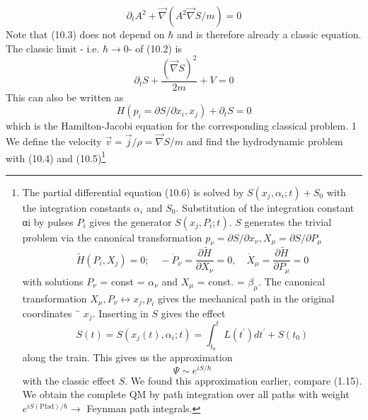 \begin{equation}
    \partial_{t} A^{2}+\vec{\nabla}\left(A^{2} \vec{\nabla} S / m\right)=0
    \end{equation}
Note that (10.3) does not depend on $\hbar$ and is therefore already a classic equation. The classic limit - i.e. $\hbar\rightarrow 0$- of (10.2) is
\begin{equation}
    \partial_{t} S+\frac{(\vec{\nabla} S)^{2}}{2 m}+V=0
    \end{equation}
This can also be written as
\begin{equation}
    H\left(p_{i}=\partial S / \partial x_{i}, x_{j}\right)+\partial_{t} S=0
    \end{equation}
which is the Hamilton-Jacobi equation for the corresponding classical problem. 1
We define the velocity $\vec{v}=\vec{j}/\rho=\vec{\nabla}S/m$  and find the hydrodynamic problem with (10.4) and (10.5)\footnote{The partial differential equation (10.6) is solved by $S (x_j, \alpha_i; t) + S_0$ with the integration constants $\alpha_i$ and $S_0$. Substitution of the integration constant αi by pulses $P_i$ gives the generator $S (x_j, P_i; t)$. $S$ generates the trivial problem via the canonical transformation $p_{\nu}=\partial S/\partial x_{\nu},X_{\mu}=\partial S/\partial P_{\mu}$
\begin{equation}
    \widetilde{H}\left(P_{i}, X_{j}\right)=0 ; \quad-\dot{P}_{\nu}=\frac{\partial \widetilde{H}}{\partial X_{\nu}}=0, \quad \dot{X}_{\mu}=\frac{\partial \widetilde{H}}{\partial P_{\mu}}=0
    \end{equation}
with solutions $P_{\nu}$ = const = $\alpha_{\nu}$ and $X_{\mu}$ = const. = $\beta_{\mu}$. The canonical transformation $X_{\mu},P_{\nu}\leftrightarrow x_j,p_i$ gives the mechanical path in the original coordinates ¨ $x_j$. Inserting in $S$ gives the effect
\begin{equation}
    S(t)=S\left(x_{j}(t), \alpha_{i} ; t\right)=\int_{t_{0}}^{t} L\left(t^{\prime}\right) d t^{\prime}+S\left(t_{0}\right)
    \end{equation}
    along the train. This gives us the approximation
    \begin{equation}
        \Psi \sim e^{iS/\hbar}
    \end{equation}
    with the classic effect $S$. We found this approximation earlier, compare (1.15). We obtain the complete QM by path integration over all paths with weight $e^{iS(\text{Pfad})/\hbar}\rightarrow$ Feynman path integrals.
}
